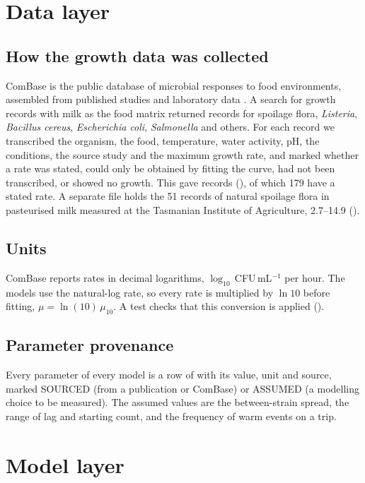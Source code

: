 \section{Data layer}
\subsection{How the growth data was collected}
ComBase is the public database of microbial responses to food environments, assembled from published studies and laboratory data \cite{baranyi2004,combase}. A search for growth records with milk as the food matrix returned records for spoilage flora, \textit{Listeria}, \textit{Bacillus cereus}, \textit{Escherichia coli}, \textit{Salmonella} and others. For each record we transcribed the organism, the food, temperature, water activity, pH, the conditions, the source study and the maximum growth rate, and marked whether a rate was stated, could only be obtained by fitting the curve, had not been transcribed, or showed no growth. This gave \DatNFull{} records (), of which 179 have a stated rate. A separate file holds the 51 records of natural spoilage flora in pasteurised milk measured at the Tasmanian Institute of Agriculture, 2.7--14.9\degC{} ().

\subsection{Units}
ComBase reports rates in decimal logarithms, $\log_{10}$\,CFU\,mL$^{-1}$ per hour. The models use the natural-log rate, so every rate is multiplied by $\ln 10$ before fitting, $\mu=\ln(10)\,\mu_{10}$. A test checks that this conversion is applied ().

\subsection{Parameter provenance}
Every parameter of every model is a row of  with its value, unit and source, marked SOURCED (from a publication or ComBase) or ASSUMED (a modelling choice to be measured). The assumed values are the between-strain spread, the range of lag and starting count, and the frequency of warm events on a trip.

\section{Model layer}
